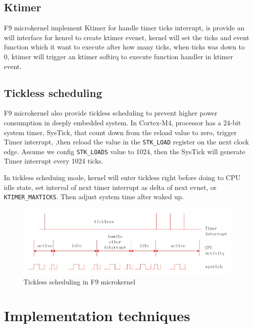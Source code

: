 \documentclass[10pt,preprint,nocopyrightspace]{sigplanconf}
\begin{document}
\subsection{Ktimer}
F9 microkernel implement Ktimer for handle timer ticks interrupt, is provide an will interface for kenrel to create ktimer evenet, kernel will set the ticks and event function which it want to execute after how many ticks, when ticks was down to 0, ktimer will trigger an ktimer softirq to execute function handler in ktimer event. 

\subsection{Tickless scheduling}

F9 microkernel also provide tickless scheduling to prevent higher power consumption in deeply embedded system\cite{freertos1,freertos2}. In Cortex-M4, processor has a 24-bit system timer, SysTick, that count down from the reload value to zero, trigger Timer interrupt, ,then reload the value in the \verb|STK_LOAD| register on the next clock edge\cite{st2016manual}. Assume we config \verb|STK_LOADS| value to 1024, then the SysTick will generate Timer interrupt every 1024 ticks.

In tickless scheduing mode, kernel will enter tickless right before doing to CPU idle state, set interval of next timer interrupt as delta of next evnet, or \verb|KTIMER_MAXTICKS|. Then adjust system time after waked up.

\begin{figure}[H]
	\begin{center}
		\includegraphics[width=\linewidth]{picture/tickless.png}
	\end{center}
	\caption{Tickless scheduling in F9 microkernel}
\end{figure}

\section{Implementation techniques}
\end{document}
